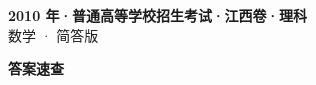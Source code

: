 \documentclass[zihao=-4, a4paper]{ctexart}
\begin{document}
\begin{center}
  {\Large\bfseries 2010 年·普通高等学校招生考试·江西卷·理科}\\[4pt]
  {\large 数学 · 简答版}
\end{center}
\medskip
{}

\clearpage
{}
\begin{center}{\Large\bfseries 答案速查}\end{center}
\medskip

\end{document}

